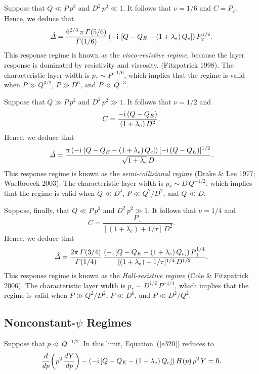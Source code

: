 \documentclass[notitlepage,12pt]{article}
\begin{document}
Suppose that $Q\ll P\,p^2$ and $D^2\,p^2\ll 1$. It follows that $\nu=1/6$ and $C=P_\varphi$. 
Hence, we deduce that
\begin{equation}\label{vr}
\hat{\mit\Delta} = \frac{6^{2/3}\,\pi\,{\mit\Gamma}(5/6)}{{\mit\Gamma}(1/6)}\, (-{\rm i}\,\left[Q-Q_E-(1+\lambda_e)\,Q_e\right])\,P_\varphi^{1/6}.
\end{equation}
This response regime is known as the {\em visco-resistive regime}, because the layer response is dominated by
resistivity and viscosity. (Fitzpatrick 1998). The characteristic layer width is $p_\ast \sim P^{-1/6}$, which implies that
the regime is valid when  $P\gg Q^{3/2}$, $P\gg D^6$, and $P\ll Q^{-3}$. 

Suppose that $Q\gg P\,p^2$ and $D^2\,p^2\gg 1$. It follows that $\nu=1/2$ and
\begin{equation}
C = \frac{-{\rm i}\,(Q-Q_E)}{(1+\lambda_e)\,D^2}.
\end{equation}
Hence, we deduce that
\begin{equation}\label{sc}
\hat{\mit\Delta}= \frac{\pi\,(-{\rm i}\,\left[Q-Q_E-(1+\lambda_e)\,Q_e\right])\,[-{\rm i}\,(Q-Q_E)]^{1/2}}{\sqrt{1+\lambda_e}\,D}.
\end{equation}
This response regime is known as the {\em semi-collisional regime}\/ (Drake \& Lee 1977; Waelbroeck 2003). The characteristic
layer width is $p_\ast\sim D\,Q^{-1/2}$. which implies that the regime is valid when $Q\ll D^4$,
 $P\ll Q^2/D^2$, and $Q\ll D$. 

Suppose, finally, that $Q\ll P\,p^2$ and $D^2\,p^2\gg 1$. It follows that $\nu=1/4$ and
\begin{equation}
C = \frac{P_\perp}{[(1+\lambda_e)+1/\tau]\,D^2}.
\end{equation}
Hence, we deduce that 
\begin{equation}\label{hr}
\hat{\mit\Delta}= \frac{2\pi\,{\mit\Gamma}(3/4)}{{\mit\Gamma}(1/4)}\,\frac{(-{\rm i}\,[Q-Q_E-(1+\lambda_e)\,Q_e])\,P_\perp^{1/4}}{[(1+\lambda_e)+1/\tau]^{1/4}\,D^{1/2}}.
\end{equation}
This response regime is known as the {\em Hall-resistive regime}\/ (Cole \& Fitzpatrick 2006). The characteristic
layer width is $p_\ast \sim D^{1/2}\,P^{-1/4}$, which implies that the regime is valid when $P\gg Q^2/D^2$,
$P\ll D^6$, and $P\ll D^2/Q^2$. 

\subsection{Nonconstant-$\psi$ Regimes}
Suppose that $p\ll Q^{-1/2}$. In this limit, Equation~(\ref{e320}) reduces to 
\begin{equation}
\frac{d}{dp}\!\left(p^2\,\frac{dY}{dp}\right)-(-{\rm i}\,[Q-Q_E-(1+\lambda_e)\,Q_e])\,H(p)\,p^2\,Y=0.
\end{equation}
\end{document}
